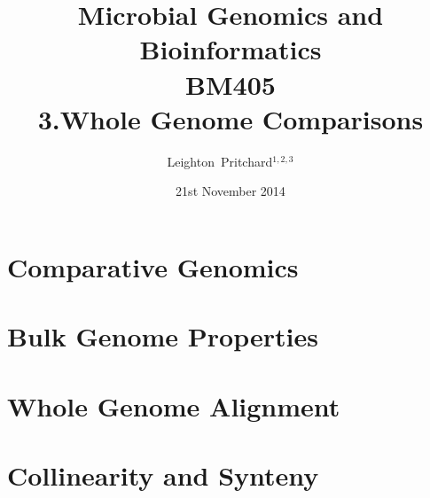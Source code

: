 

%



\title[Microbial Genomics and Bioinformatics: 3.Whole Genome Comparisons] %
{Microbial Genomics and \\ Bioinformatics \\
BM405 \\
3.Whole Genome Comparisons}
\author[Pritchard] %
{Leighton~Pritchard$^{1,2,3}$}
\date[21st November 2014] %
{21st November 2014}
\subject{Bioinformatics, Genomics, Bacteria, Sequencing, Microbiology, Microbes}





\frame[plain]{\titlepage}



\section{Comparative Genomics}
%

\section{Bulk Genome Properties}
%

\section{Whole Genome Alignment}
%

\section{Collinearity and Synteny}
%


%




